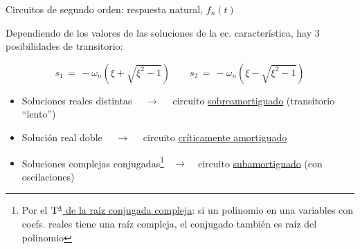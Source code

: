 \documentclass[aspectratio=169, usenames,svgnames,dvipsnames]{beamer}
\begin{document}
\begin{frame}{Circuitos de segundo orden: \hspace{3mm}respuesta natural, \hspace{3mm}$f_n(t)$}
    \setcounter{footnote}{0}
    
    Dependiendo de los \alert{valores de las soluciones} de la ec. característica, hay \alert{3 posibilidades de transitorio}:

    \vspace{-5mm}
    \[
        s_1 \,=\, -\omega_n\left(\xi+\sqrt{\xi^2-1} \right) 
        \qquad
        s_2 \,=\, -\omega_n\left(\xi-\sqrt{\xi^2-1} \right)
    \]

    \begin{itemize}
        \vspace{3mm}
        \item Soluciones \alert{reales distintas} $\quad\rightarrow\quad$ circuito \underline{\alert{sobreamortiguado}} (transitorio ``lento'')

        \vspace{3mm}
        \item Solución \alert{real doble} $\quad\rightarrow\quad$ circuito \underline{\alert{críticamente amortiguado}}

        \vspace{3mm}
        \item Soluciones \alert{complejas conjugadas}\footnote{Por el \href{https://es.wikipedia.org/wiki/Teorema_de_la_ra\%C3\%ADz_conjugada_compleja}{$\mbox{T}^{\textrm{\underline{a}}}$ de la raíz conjugada compleja}:  si un polinomio en una variables con coefs. reales tiene una raíz compleja, el conjugado también es raíz del polinomio} $\;\;\rightarrow\;\;\,$ circuito \underline{\alert{subamortiguado}} (con oscilaciones)
    \end{itemize}
\end{frame}

\end{document}
